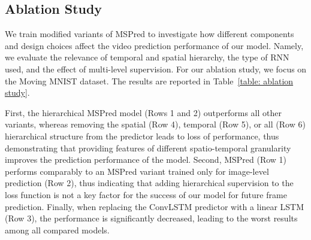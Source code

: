 \documentclass{bmvc2k}
\newcommand{\Table}[1]{Table~\ref{#1}}
\begin{document}
\subsection{Ablation Study}
\label{section: ablation}

We train modified variants of MSPred to investigate how different components and design choices affect the video prediction performance of our model. Namely, we evaluate the relevance of temporal and spatial hierarchy, the type of RNN used, and the effect of multi-level supervision. For our ablation study, we focus on the Moving MNIST dataset.
The results are reported in \Table{table: ablation study}.

First, the hierarchical MSPred model (Rows 1 and 2) outperforms all other variants, whereas removing the spatial (Row 4), temporal (Row 5), or all (Row 6) hierarchical structure from the predictor leads to loss of performance, thus demonstrating that providing features of different spatio-temporal granularity improves the prediction performance of the model.
Second, MSPred (Row 1) performs comparably to an MSPred variant trained only for image-level prediction (Row 2), thus indicating that adding hierarchical supervision to the loss function is not a key factor for the success of our model for future frame prediction.
Finally, when replacing the ConvLSTM predictor with a linear LSTM (Row 3), the performance is significantly decreased, leading to the worst results among all compared models.
\end{document}
